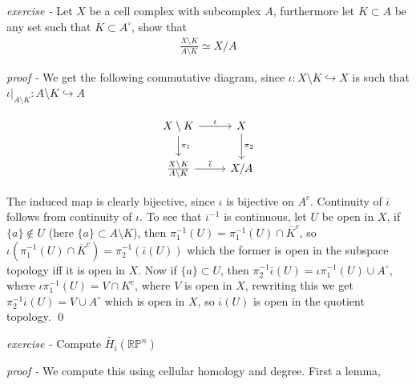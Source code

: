 \documentclass[11pt]{article}
\theoremstyle{definition}
\newcommand{\set}[1]{\{#1\}}
\begin{document}

    \emph{exercise - }\label{HEx16} Let \(X\) be a cell complex with subcomplex \(A\), furthermore let \(K \subset A\) be any set such that \(\overline{K} \subset A^\circ\), show that
    \begin{align*}
        \frac{X \setminus K}{A \setminus K} \simeq X/A
    \end{align*}

    \emph{proof - } We get the following commutative diagram, since \(\iota: X \setminus K \hookrightarrow X\) is such that \(\iota \vert_{A \setminus K} : A \setminus K \hookrightarrow A\)

    \begin{equation*}
        \begin{tikzcd}
            X \setminus K \arrow[r,"{\iota}"] \arrow[d,"{\pi_1}"] & X \arrow[d,"{\pi_2}"] \\
            \frac{X \setminus K}{A \setminus K} \arrow[r,"{\overline{\iota}}"] & X/A
        \end{tikzcd}
    \end{equation*}

    The induced map is clearly bijective, since \(\iota\) is bijective on \(A^c\). Continuity of \(\overline{\iota}\) follows from continuity of \(\iota\). To see that \(\overline{\iota}^{-1}\) is continuous, let \(U\) be open  in \(X\), if \(\set{a} \not \in U\) (here \(\set{a} \subset A \setminus K\)), then \(\pi_1^{-1}(U) = \pi_1^{-1}(U) \cap \overline{K}^c\), so \(\iota(\pi_1^{-1}(U) \cap \overline{K}^c) = \pi_2^{-1}(\overline{\iota}(U))\) which the former is open in the subspace topology iff it is open in \(X\). Now if \(\set{a} \subset U\), then \(\pi_2^{-1}\overline{\iota}(U) = \iota\pi_1^{-1}(U) \cup A^\circ\), where \(\iota\pi_1^{-1}(U) = V \cap K^c\), where \(V\) is open in \(X\), rewriting this we get \(\pi_2^{-1}\overline{\iota}(U) = V \cup A^\circ\) which is open in \(X\), so \(\overline{\iota}(U)\) is open in the quotient topology. \qed



    \emph{exercise - }\label{HEx17} Compute \(\tilde{H_i}(\mathbb{RP}^n)\)

    \emph{proof - } We compute this using cellular homology and degree. First a lemma,
\end{document}
